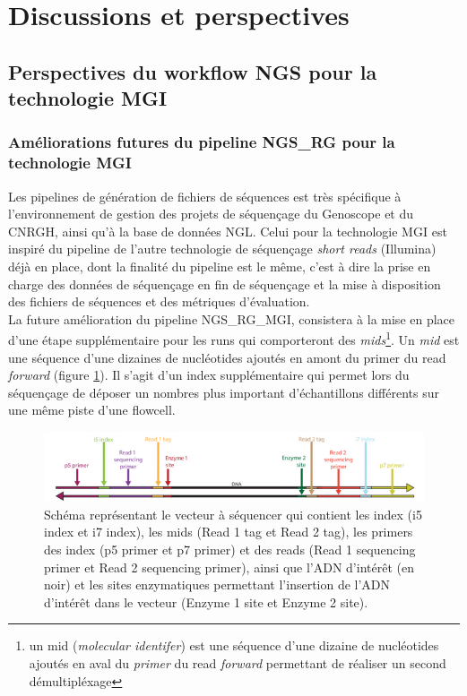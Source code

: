 \section{Discussions et perspectives}
\subsection{Perspectives du workflow NGS pour la technologie MGI}

\subsubsection{Améliorations futures du pipeline NGS\_RG pour la technologie MGI}
Les pipelines de génération de fichiers de séquences est très spécifique à l'environnement de gestion des projets de séquençage du Genoscope et du CNRGH, ainsi qu'à la base de données NGL. Celui pour la technologie MGI est inspiré du pipeline de l'autre technologie de séquençage \emph{short reads} (Illumina) déjà en place, dont la finalité du pipeline est le même, c'est à dire la prise en charge des données de séquençage en fin de séquençage et la mise à disposition des fichiers de séquences et des métriques d'évaluation.\\

La future amélioration du pipeline NGS\_RG\_MGI, consistera à la mise en place d'une étape supplémentaire pour les runs qui comporteront des \emph{mids}\footnote{un mid (\emph{molecular identifer}) est une séquence d'une dizaine de nucléotides ajoutés en aval du \emph{primer} du read \emph{forward} permettant de réaliser un second démultipléxage}. 
Un \emph{mid} est une séquence d'une dizaines de nucléotides ajoutés en amont du primer du read \emph{forward} (figure \ref{schema-mid}). Il s'agit d'un index supplémentaire qui permet lors du séquençage de déposer un nombres plus important d'échantillons différents sur une même piste d'une flowcell. 

\begin{figure}[H]
    \centering
    \includegraphics[width=1\textwidth]{img/schema-reads-index-mids.png}
    \caption{\footnotesize{Schéma représentant le vecteur à séquencer qui contient les index (i5 index et i7 index), les mids (Read 1 tag et Read 2 tag), les primers des index (p5 primer et p7 primer) et des reads (Read 1 sequencing primer et Read 2 sequencing primer), ainsi que l'ADN d'intérêt (en noir) et les sites enzymatiques permettant l'insertion de l'ADN d'intérêt dans le vecteur (Enzyme 1 site et Enzyme 2 site).}}
    \label{schema-mid}
\end{figure}

